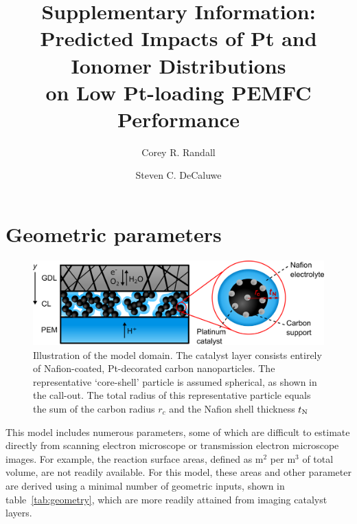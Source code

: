 \documentclass[final,3p,times,onecolumn]{elsarticle}    %
\begin{document}
\begin{frontmatter}
\title{Supplementary Information: Predicted Impacts of Pt and Ionomer Distributions \\ 
       on Low Pt-loading PEMFC Performance}

\author[CSM]{Corey R. Randall}
\author[CSM]{Steven C. DeCaluwe }
        
\address[CSM]{Colorado School of Mines, 1500 Illinois St, Golden, CO 80401}
\end{frontmatter}

\section{Geometric parameters}

\begin{figure}[H]
    \centering
    \includegraphics[width=5.718in]{figures/core_shell_SI.png}
    \caption{Illustration of the model domain. The catalyst layer consists entirely of Nafion-coated, Pt-decorated carbon nanoparticles.  The representative `core-shell' particle is assumed spherical, as shown in the call-out. The total radius of this representative particle equals the sum of the carbon radius $r_c$ and the Nafion shell thickness $t_{\rm N}$}
    \label{fig:core_shell_SI}
\end{figure}

This model includes numerous parameters, some of which are difficult to estimate directly from scanning electron microscope or transmission electron microscope images. For example, the reaction surface areas, defined as m$^2$ per m$^3$ of total volume, are not readily available. For this model, these areas and other parameter are derived using a minimal number of geometric inputs, shown in table~\ref{tab:geometry}, which are more readily attained from imaging catalyst layers.
\end{document}
